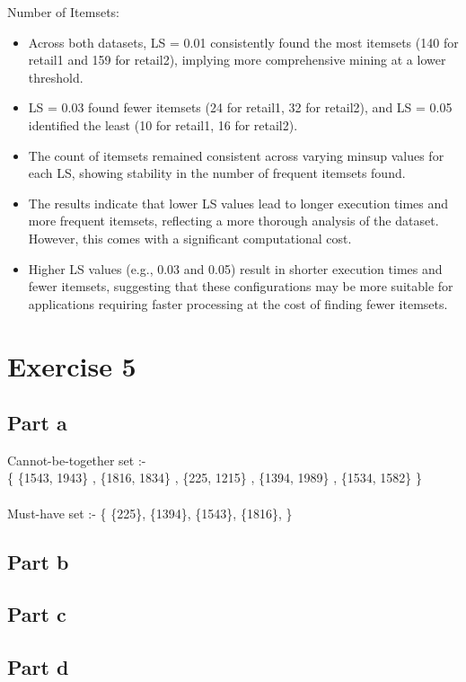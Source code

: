 \documentclass[12pt]{article}
\begin{document}
Number of Itemsets: %
\begin{itemize}
    \item Across both datasets, LS = 0.01 consistently found the most itemsets (140 for retail1 and 159 for retail2), implying more comprehensive mining at a lower threshold.
    \item LS = 0.03 found fewer itemsets (24 for retail1, 32 for retail2), and LS = 0.05 identified the least (10 for retail1, 16 for retail2).
    \item The count of itemsets remained consistent across varying minsup values for each LS, showing stability in the number of frequent itemsets found.
    \item The results indicate that lower LS values lead to longer execution times and more frequent itemsets, reflecting a more thorough analysis of the dataset. However, this comes with a significant computational cost.
    \item Higher LS values (e.g., 0.03 and 0.05) result in shorter execution times and fewer itemsets, suggesting that these configurations may be more suitable for applications requiring faster processing at the cost of finding fewer itemsets.
\end{itemize}

\clearpage
\section*{Exercise 5}
\subsection*{Part a}
Cannot-be-together set :- \\ 
\{ \{1543, 1943\} , 
    \{1816, 1834\} , 
    \{225, 1215\} , 
    \{1394, 1989\} , 
    \{1534, 1582\} \}\\
\\
Must-have set :-
\{ \{225\}, 
    \{1394\},
    \{1543\},
    \{1816\},
\}

\subsection*{Part b}

\subsection*{Part c}

\subsection*{Part d}
\end{document}
